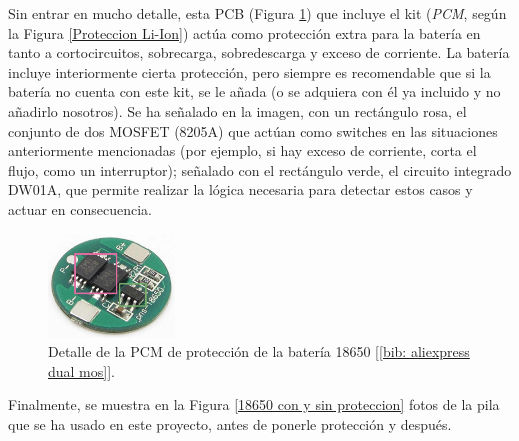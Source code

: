 \documentclass[12pt]{article}
\begin{document}
	\pagebreak
	
	\noindent Sin entrar en mucho detalle, esta PCB (Figura \ref{PCB proteccion Li-Ion}) que incluye el kit (\textit{PCM}, según la Figura \ref{Proteccion Li-Ion})  actúa como protección extra para la batería en tanto a cortocircuitos, sobrecarga, sobredescarga y exceso de corriente. La batería incluye interiormente cierta protección, pero siempre es recomendable que si la batería no cuenta con este kit, se le añada (o se adquiera con él ya incluido y no añadirlo nosotros). Se ha señalado en la imagen, con un rectángulo rosa, el conjunto de dos MOSFET (8205A) que actúan como switches en las situaciones anteriormente mencionadas (por ejemplo, si hay exceso de corriente, corta el flujo, como un interruptor); señalado con el rectángulo verde, el circuito integrado DW01A, que permite realizar la lógica necesaria para detectar estos casos y actuar en consecuencia. 
	
	\begin{figure}[h!]
		\begin{center}
			\includegraphics[width=0.3\textwidth]{img/batt_prot_circuit_zoom_edited.png}
			\caption{Detalle de la PCM de protección de la batería 18650 [\ref{bib: aliexpress dual mos}].}
			\label{PCB proteccion Li-Ion}
		\end{center}
	\end{figure}
	
	\noindent Finalmente, se muestra en la Figura \ref{18650 con y sin proteccion} fotos de la pila que se ha usado en este proyecto, antes de ponerle protección y después.
	
\end{document}
